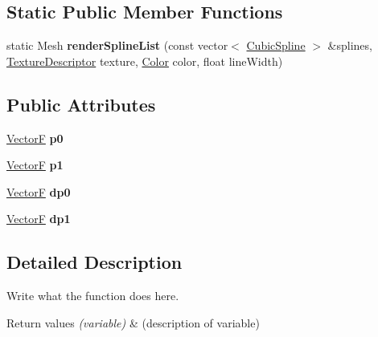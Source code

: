 \subsection*{Static Public Member Functions}
\begin{DoxyCompactItemize}
\item 
\hypertarget{structCubicSpline_ab4f44a0380e5834289a60957baeaf822}{static Mesh {\bfseries render\+Spline\+List} (const vector$<$ \hyperlink{structCubicSpline}{Cubic\+Spline} $>$ \&splines, \hyperlink{structTextureDescriptor}{Texture\+Descriptor} texture, \hyperlink{structColor}{Color} color, float line\+Width)}\label{structCubicSpline_ab4f44a0380e5834289a60957baeaf822}

\end{DoxyCompactItemize}
\subsection*{Public Attributes}
\begin{DoxyCompactItemize}
\item 
\hypertarget{structCubicSpline_a84b61c539162fcfa38762e67261e3db6}{\hyperlink{structVectorF}{Vector\+F} {\bfseries p0}}\label{structCubicSpline_a84b61c539162fcfa38762e67261e3db6}

\item 
\hypertarget{structCubicSpline_a1bee668bf0240d7b70fc7f93638d253a}{\hyperlink{structVectorF}{Vector\+F} {\bfseries p1}}\label{structCubicSpline_a1bee668bf0240d7b70fc7f93638d253a}

\item 
\hypertarget{structCubicSpline_a5ebae554d5f1da3baa730d698d1667ff}{\hyperlink{structVectorF}{Vector\+F} {\bfseries dp0}}\label{structCubicSpline_a5ebae554d5f1da3baa730d698d1667ff}

\item 
\hypertarget{structCubicSpline_aeefcf5d9423158b97037640c26cf24f0}{\hyperlink{structVectorF}{Vector\+F} {\bfseries dp1}}\label{structCubicSpline_aeefcf5d9423158b97037640c26cf24f0}

\end{DoxyCompactItemize}


\subsection{Detailed Description}
Write what the function does here. 


\begin{DoxyRetVals}{Return values}
{\em (variable)} & (description of variable) \\
\hline
\end{DoxyRetVals}


